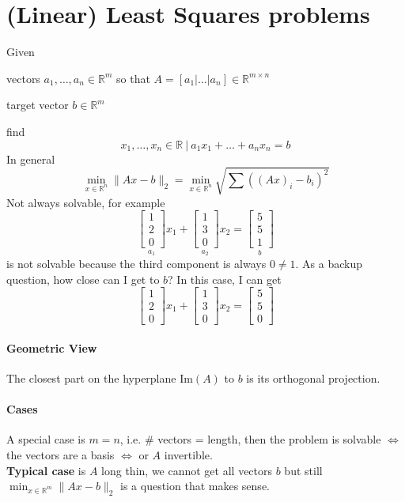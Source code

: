\documentclass[10pt]{report}
\begin{document}
\section{(Linear) Least Squares problems}
Given 
\begin{list}{}{}
	\item vectors $a_1,\ldots,a_n\in \mathbb{R}^m$ so that $A = [a_1|\ldots|a_n]\in \mathbb{R}^{m\times n}$
	\item target vector $b\in \mathbb{R}^m$
\end{list}
find $$x_1,\ldots,x_n\in \mathbb{R}\:|\: a_1x_1 + \ldots + a_n x_n = b$$
In general $$\min_{x\in \mathbb{R}^n} \|Ax - b\|_2 = \min_{x\in \mathbb{R}^n} \sqrt{\sum \left((Ax)_i - b_i\right)^2}$$
Not always solvable, for example $$\underset{a_1}{\left[\begin{array}{c}
1\\2\\0
\end{array}\right]}x_1 + \underset{a_2}{\left[\begin{array}{c}
1\\3\\0
\end{array}\right]}x_2 = \underset{b}{\left[\begin{array}{c}
5\\5\\1
\end{array}\right]}$$ is not solvable because the third component is always $0 \neq 1$. As a backup question, how close can I get to $b$? In this case, I can get $$\left[\begin{array}{c}
1\\2\\0
\end{array}\right]x_1 + \left[\begin{array}{c}
1\\3\\0
\end{array}\right]x_2 = \left[\begin{array}{c}
5\\5\\0
\end{array}\right]$$
\paragraph{Geometric View} The closest part on the hyperplane $\text{Im}(A)$ to $b$ is its orthogonal projection.
\paragraph{Cases} A special case is $m=n$, i.e. \# vectors = length, then the problem is solvable $\Leftrightarrow$ the vectors are a basis $\Leftrightarrow$ or $A$ invertible.\\
\textbf{Typical case} is $A$ long thin, we cannot get all vectors $b$ but still $\min_{x\in \mathbb{R}^m} \|Ax - b\|_2$ is a question that makes sense. 
\end{document}
